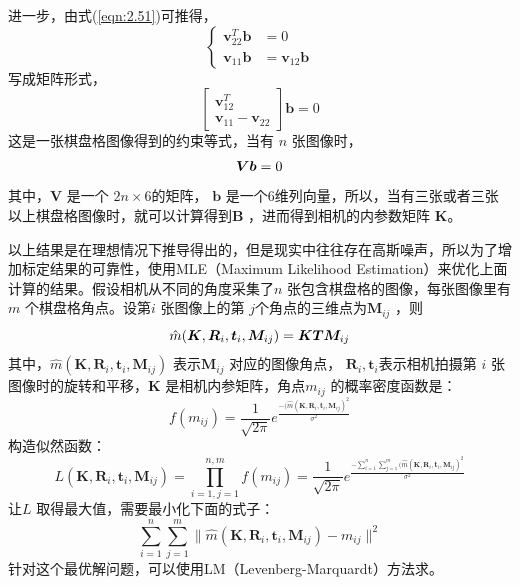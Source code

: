 进一步，由式(\ref{eqn:2.51})可推得，
\begin{equation}
\label{eqn:2.59}
\left\{
\begin{aligned} 
\bm{v}_{22}^T \bm{b} &= 0 \\ 
\bm{v}_{11} \bm{b} &= \bm{v}_{12} \bm{b} 
\end{aligned}
\right.
\end{equation}
写成矩阵形式，
\begin{equation}
\label{eqn:2.60}
\left[ 
\begin{array}{c} \bm{v}_{12}^T \\ \bm{v}_{11}-\bm{v}_{22} \end{array}
\right] \bm{b}  = 0
\end{equation}
这是一张棋盘格图像得到的约束等式，当有 $n$  张图像时，
\begin{equation}
\label{eqn:2.61}
\setlength{\abovedisplayskip}{6pt}
\setlength{\belowdisplayskip}{6pt}
\bm{Vb} = 0
\end{equation}
其中，$\bm{V} $ 是一个 $2n \times 6 $的矩阵， $\bm{b} $ 是一个6维列向量，所以，当有三张或者三张以上棋盘格图像时，就可以计算得到$\bm{B} $ ，进而得到相机的内参数矩阵 $\bm{K} $。

以上结果是在理想情况下推导得出的，但是现实中往往存在高斯噪声，所以为了增加标定结果的可靠性，使用MLE（Maximum Likelihood Estimation）来优化上面计算的结果。假设相机从不同的角度采集了$n$ 张包含棋盘格的图像，每张图像里有$m$ 个棋盘格角点。设第$i$ 张图像上的第 $j$个角点的三维点为$\bm{M}_{ij} $ ，则	
\begin{equation}
\label{eqn:2.62}
\setlength{\abovedisplayskip}{6pt}
\setlength{\belowdisplayskip}{6pt}
\hat{m}( \bm{K},\bm{R}_i,\bm{t}_i,\bm{M}_{ij}) = \bm{K}\bm{T}\bm{M}_{ij}
\end{equation}
其中，$\hat{m}( \bm{K},\bm{R}_i,\bm{t}_i,\bm{M}_{ij} )  $ 表示$\bm{M}_{ij} $ 对应的图像角点， $\bm{R}_i,\bm{t}_i $表示相机拍摄第  $i$ 张图像时的旋转和平移，$\bm{K} $ 是相机内参矩阵，角点$m_{ij} $ 的概率密度函数是：
\begin{equation}
\label{eqn:2.63}
f(m_{ij})=\frac{1}{\sqrt{2\pi}}e^{\frac{-(\hat{m}( \bm{K},\bm{R}_i,\bm{t}_i,\bm{M}_{ij} )^2}{\sigma^2}}
\end{equation}
构造似然函数：
\begin{equation}
\label{eqn:2.64}
L(\bm{K},\bm{R}_i,\bm{t}_i,\bm{M}_{ij}  ) = \prod^{n,m}_{i=1,j=1}f(m_{ij})=\frac{1}{\sqrt{2\pi}}e^{\frac{-\sum^n_{i=1}\sum^m_{j=1}(\hat{m}( \bm{K},\bm{R}_i,\bm{t}_i,\bm{M}_{ij} )^2}{\sigma^2}}
\end{equation}
让$L $ 取得最大值，需要最小化下面的式子：
\begin{equation}
\label{eqn:2.65}
\sum^n_{i=1}\sum^m_{j=1} \| \hat{m}( \bm{K},\bm{R}_i,\bm{t}_i,\bm{M}_{ij} )-m_{ij} \|^2
\end{equation}
针对这个最优解问题，可以使用LM（Levenberg-Marquardt）方法求。


